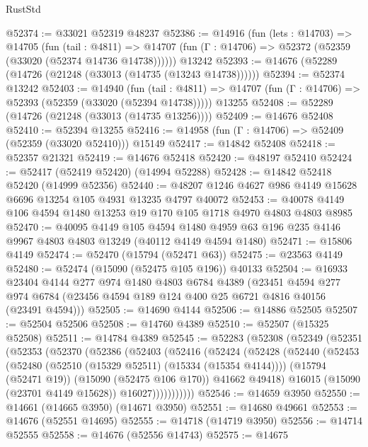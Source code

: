 \begin{lexlean}{RustStd}
\begin{coremodule}
@52374 := @33021 @52319 @48237
@52386 := @14916
    (fun (lets : @14703) =>
    @14705
      (fun (tail : @4811) =>
      @14707 (fun (Γ : @14706) => @52372 (@52359 (@33020 (@52374 @14736 @14738))))))
    @13242
@52393 := @14676 (@52289 (@14726 (@21248 (@33013 (@14735 (@13243 @14738))))))
@52394 := @52374 @13242
@52403 := @14940
    (fun (tail : @4811) => @14707 (fun (Γ : @14706) => @52393 (@52359 (@33020 (@52394 @14738)))))
    @13255
@52408 := @52289 (@14726 (@21248 (@33013 (@14735 @13256))))
@52409 := @14676 @52408
@52410 := @52394 @13255
@52416 := @14958 (fun (Γ : @14706) => @52409 (@52359 (@33020 @52410))) @15149
@52417 := @14842 @52408
@52418 := @52357 @21321
@52419 := @14676 @52418
@52420 := @48197 @52410
@52424 := @52417 (@52419 @52420) (@14994 @52288)
@52428 := @14842 @52418 @52420 (@14999 @52356)
@52440 := @48207 @1246 @4627 @986 @4149 @15628 @6696 @13254 @105 @4931 @13235 @4797 @40072
@52453 := @40078 @4149 @106 @4594 @1480 @13253 @19 @170 @105 @1718 @4970 @4803 @4803 @8985
@52470 := @40095
    @4149
    @105
    @4594
    @1480
    @4959
    @63
    @196
    @235
    @4146
    @9967
    @4803
    @4803
    @13249
    (@40112 @4149 @4594 @1480)
@52471 := @15806 @4149
@52474 := @52470 (@15794 (@52471 @63))
@52475 := @23563 @4149
@52480 := @52474 (@15090 (@52475 @105 @196)) @40133
@52504 := @16933
    @23404
    @4144
    @277
    @974
    @1480
    @4803
    @6784
    @4389
    (@23451
      @4594
      @277
      @974
      @6784
      (@23456 @4594 @189 @124 @400 @25 @6721 @4816 @40156 (@23491 @4594)))
@52505 := @14690 @4144
@52506 := @14886 @52505
@52507 := @52504 @52506
@52508 := @14760 @4389
@52510 := @52507 (@15325 @52508)
@52511 := @14784 @4389
@52545 := @52283
    (@52308
      (@52349
        (@52351
          (@52353
            (@52370
              (@52386
                (@52403
                  (@52416
                    (@52424
                      (@52428
                        (@52440
                          (@52453
                            (@52480 (@52510 (@15329 @52511) (@15334 (@15354 @4144))))
                            (@15794 (@52471 @19))
                            (@15090 (@52475 @106 @170))
                            @41662
                            @49418)
                          @16015
                          (@15090 (@23701 @4149 @15628))
                          @16027)))))))))))
@52546 := @14659 @3950
@52550 := @14661 (@14665 @3950) (@14671 @3950)
@52551 := @14680 @49661
@52553 := @14676 (@52551 @14695)
@52555 := @14718 (@14719 @3950)
@52556 := @14714 @52555
@52558 := @14676 (@52556 @14743)
@52575 := @14675

\end{coremodule}
\end{lexlean}
